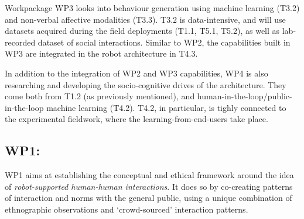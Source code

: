 Workpackage WP3 looks into behaviour generation using machine learning (T3.2)
and non-verbal affective modalities (T3.3). T3.2 is data-intensive, and will use
datasets acquired during the field deployments (T1.1, T5.1, T5.2), as well as
lab-recorded dataset of social interactions. Similar to WP2, the capabilities
built in WP3 are integrated in the robot architecture in T4.3.

In addition to the integration of WP2 and WP3 capabilities, WP4 is also
researching and developing the socio-cognitive drives of the architecture. They
come both from T1.2 (as previously mentioned), and
human-in-the-loop/public-in-the-loop machine learning (T4.2). T4.2, in
particular, is tighly connected to the experimental fieldwork, where the
learning-from-end-users take place.

%
%
%

\subsection{WP1: \textbf{\wpOne}}

WP1 aims at establishing the conceptual and ethical framework around the idea of
\emph{robot-supported human-human interactions}. It does so by co-creating
patterns of interaction and norms with the general public, using a unique
combination of ethnographic observations and `crowd-sourced' interaction
patterns.

